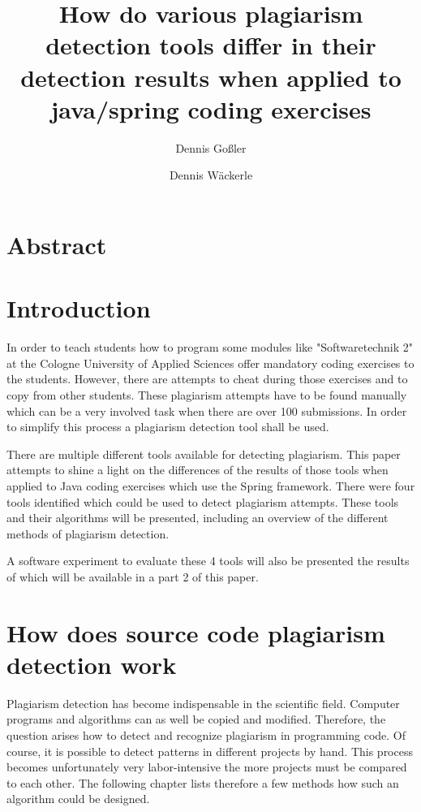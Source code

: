 \documentclass[a4paper, 11pt]{article}
\renewcommand{\\}{\vspace*{0.5\baselineskip} \newline}
\begin{document}
\title{How do various plagiarism detection tools differ in their detection results when applied to java/spring coding exercises}
\author{Dennis Goßler \and Dennis Wäckerle}
\maketitle

\section*{Abstract}
\newpage
\tableofcontents
\newpage

\section{Introduction}

In order to teach students how to program some modules like "Softwaretechnik 2" at the Cologne University of Applied Sciences offer mandatory coding exercises to the students. However, there are attempts to cheat during those exercises and to copy from other students. These plagiarism attempts have to be found manually which can be a very involved task when there are over 100 submissions. In order to simplify this process a plagiarism detection tool shall be used.

There are multiple different tools available for detecting plagiarism. This paper attempts to shine a light on the differences of the results of those tools when applied to Java coding exercises which use the Spring framework. There were four tools identified which could be used to detect plagiarism attempts. These tools and their algorithms will be presented, including an overview of the different methods of plagiarism detection.

A software experiment to evaluate these 4 tools will also be presented the results of which will be available in a part 2 of this paper.

\clearpage

\section{How does source code plagiarism detection work}

Plagiarism detection has become indispensable in the scientific field. Computer programs and algorithms can as well be copied and modified. Therefore, the question arises how to detect and recognize plagiarism in programming code. Of course, it is possible to detect patterns in different projects by hand. This process becomes unfortunately very labor-intensive the more projects must be compared to each other. The following chapter lists therefore a few methods how such an algorithm could be designed.
\end{document}
